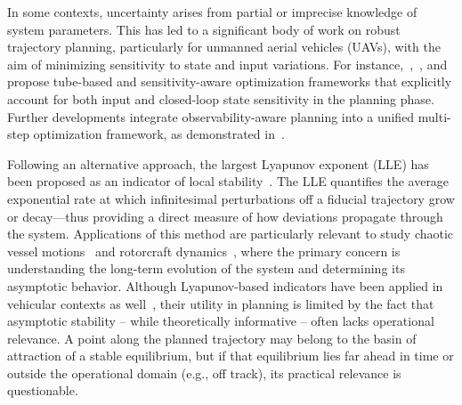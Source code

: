 In some contexts, uncertainty arises from partial or imprecise knowledge of system parameters. This has led to a significant body of work on robust trajectory planning, particularly for unmanned aerial vehicles (UAVs), with the aim of minimizing sensitivity to state and input variations. For instance,~\cite{Brault:RobustTrajectoryPlanning:2021},~\cite{Giordano:TrajectoryGenerationMinimum:2018}, and~\cite{Brault:TubebasedTrajectoryOptimization:} propose tube-based and sensitivity-aware optimization frameworks that explicitly account for both input and closed-loop state sensitivity in the planning phase. Further developments integrate observability-aware planning into a unified multi-step optimization framework, as demonstrated in~\cite{Bohm:COPControlObservabilityaware:2022}.

Following an alternative approach, the largest Lyapunov exponent (LLE) has been proposed as an indicator of local stability~\cite{Meng:AnalysisGlobalCharacteristics:2022}. The LLE quantifies the average exponential rate at which infinitesimal perturbations off a fiducial trajectory grow or decay---thus providing a direct measure of how deviations propagate through the system. 
Applications of this method are particularly relevant to study chaotic vessel motions~\cite{McCue:UseLyapunovExponents:2011} and rotorcraft dynamics~\cite{Tamer:StabilityNonlinearTimeDependent:2016,Cassoni:RotorcraftStabilityAnalysis:2024}, where the primary concern is understanding the long-term evolution of the system and determining its asymptotic behavior.
Although Lyapunov-based indicators have been applied in vehicular contexts as well~\cite{Sadri:StabilityAnalysisNonlinear:2013,Meng:AnalysisGlobalCharacteristics:2022}, their utility in planning is limited by the fact that asymptotic stability -- while theoretically informative -- often lacks operational relevance. A point along the planned trajectory may belong to the basin of attraction of a stable equilibrium, but if that equilibrium lies far ahead in time or outside the operational domain (e.g., off track), its practical relevance is questionable.

